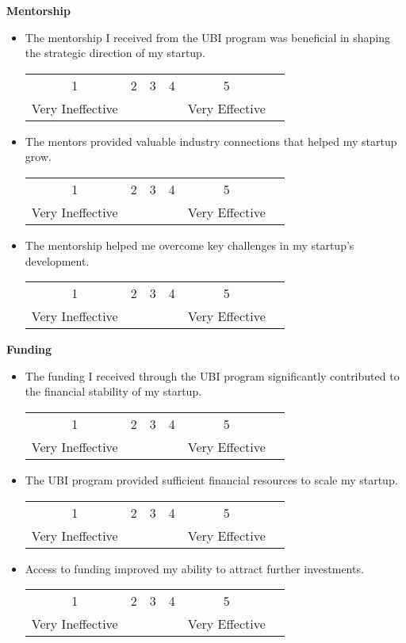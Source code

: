 \documentclass[../Main.tex]{subfiles}%
\begin{document}
	\textbf{Mentorship}
	\begin{itemize}
		\item The mentorship I received from the UBI program was beneficial in shaping the strategic direction of my startup.
		\begin{center}
		\begin{tabular}{cccccc}
		1 & 2 & 3 & 4 & 5 \\
		Very Ineffective & & & & Very Effective
		\end{tabular}
		\end{center}
		\item The mentors provided valuable industry connections that helped my startup grow.
		\begin{center}
		\begin{tabular}{cccccc}
		1 & 2 & 3 & 4 & 5 \\
		Very Ineffective & & & & Very Effective
		\end{tabular}
		\end{center}
		\item The mentorship helped me overcome key challenges in my startup's development.
		\begin{center}
		\begin{tabular}{cccccc}
		1 & 2 & 3 & 4 & 5 \\
		Very Ineffective & & & & Very Effective
		\end{tabular}
		\end{center}
	\end{itemize}
	
	\textbf{Funding}
	\begin{itemize}
		\item The funding I received through the UBI program significantly contributed to the financial stability of my startup.
		\begin{center}
		\begin{tabular}{cccccc}
		1 & 2 & 3 & 4 & 5 \\
		Very Ineffective & & & & Very Effective
		\end{tabular}
		\end{center}
		\item The UBI program provided sufficient financial resources to scale my startup.
		\begin{center}
		\begin{tabular}{cccccc}
		1 & 2 & 3 & 4 & 5 \\
		Very Ineffective & & & & Very Effective
		\end{tabular}
		\end{center}
		\item Access to funding improved my ability to attract further investments.
		\begin{center}
		\begin{tabular}{cccccc}
		1 & 2 & 3 & 4 & 5 \\
		Very Ineffective & & & & Very Effective
		\end{tabular}
		\end{center}
	\end{itemize}
	
\end{document}
